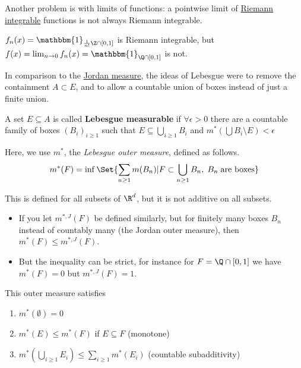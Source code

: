 \documentclass{article}
\newcommand{\1}[1]{\mathbbm{1}_{#1}}
\begin{document}
Another problem is with limits of functions: a pointwise limit of \hyperlink{def:riemannIntegrable}{Riemann integrable} functions is not always Riemann integrable.
\begin{eg}
    $f_n(x) = \1{\frac1{n!}\Z \cap [0, 1]}$ is Riemann integrable, but $f(x) = \lim_{n \to 0} f_n(x) = \1{\Q \cap [0, 1]}$ is not.
\end{eg}

In comparison to the \hyperlink{def:jMeasure}{Jordan measure}, the ideas of Lebesgue were to remove the containment $A \subset E$, and to allow a countable union of boxes instead of just a finite union.
\begin{defi}
    A set $E \subseteq A$ is called \textbf{Lebesgue measurable} if $\forall \epsilon > 0$ there are a countable family of boxes $(B_i)_{i \geq 1}$ such that $E \subseteq \bigcup_{i \geq 1} B_i$ and $m^* (\bigcup B_i \setminus E) < \epsilon$
\end{defi}

Here, we use $m^*$, the \emph{Lebesgue outer measure}, defined as follows.
\begin{equation*}
    m^*(F) = \inf\Set{\sum_{n \geq 1} m(B_n) | F \subset \bigcup_{n \geq 1} B_n, \; B_n \; \text{are boxes}}
\end{equation*}

This is defined for all subsets of $\R^d$, but it is not additive on all subsets.
\begin{remark}
    \leavevmode
    \begin{itemize}
        \item If you let $m^{*, J}(F)$ be defined similarly, but for finitely many boxes $B_n$ instead of countably many (the Jordan outer measure), then $m^*(F) \leq m^{*, J}(F)$.
        \item But the inequality can be strict, for instance for $F = \Q \cap [0, 1]$ we have $m^*(F) = 0$ but $m^{*, J}(F) = 1$.
    \end{itemize}
\end{remark}
This outer measure satisfies
\begin{enumerate}
    \item $m^*(\emptyset) = 0$
    \item $m^*(E) \leq m^*(F)$ if $E \subseteq F$ (monotone)
    \item $m^*\left(\bigcup_{i \geq 1} E_i\right) \leq \sum_{i \geq 1} m^* (E_i)$ (countable subadditivity)
\end{enumerate}
\end{document}
